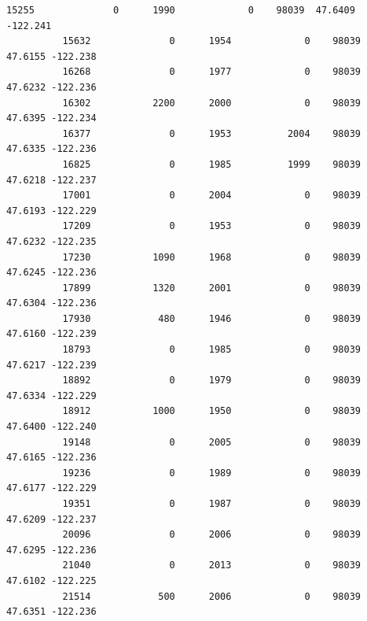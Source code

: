 \documentclass[11pt]{article}
\begin{document}
\begin{Verbatim}[commandchars=\\\{\}]
          15255              0      1990             0    98039  47.6409 -122.241   
          15632              0      1954             0    98039  47.6155 -122.238   
          16268              0      1977             0    98039  47.6232 -122.236   
          16302           2200      2000             0    98039  47.6395 -122.234   
          16377              0      1953          2004    98039  47.6335 -122.236   
          16825              0      1985          1999    98039  47.6218 -122.237   
          17001              0      2004             0    98039  47.6193 -122.229   
          17209              0      1953             0    98039  47.6232 -122.235   
          17230           1090      1968             0    98039  47.6245 -122.236   
          17899           1320      2001             0    98039  47.6304 -122.236   
          17930            480      1946             0    98039  47.6160 -122.239   
          18793              0      1985             0    98039  47.6217 -122.239   
          18892              0      1979             0    98039  47.6334 -122.229   
          18912           1000      1950             0    98039  47.6400 -122.240   
          19148              0      2005             0    98039  47.6165 -122.236   
          19236              0      1989             0    98039  47.6177 -122.229   
          19351              0      1987             0    98039  47.6209 -122.237   
          20096              0      2006             0    98039  47.6295 -122.236   
          21040              0      2013             0    98039  47.6102 -122.225   
          21514            500      2006             0    98039  47.6351 -122.236   
          

\end{Verbatim}
\end{document}
